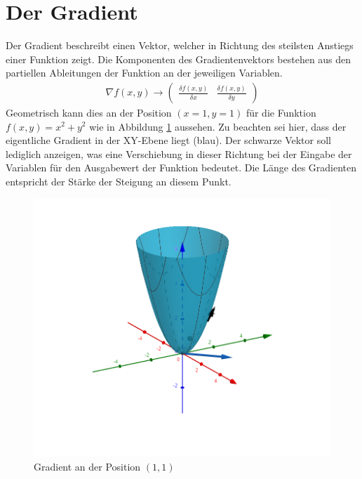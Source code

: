 \section{Der Gradient}\label{chapter:00_gradient}
Der Gradient beschreibt einen Vektor, welcher in Richtung des steilsten Anstiegs einer Funktion zeigt.
Die Komponenten des Gradientenvektors bestehen aus den partiellen Ableitungen der Funktion an der jeweiligen Variablen.
\begin{align}
    \nabla f(x,y) \longrightarrow \begin{pmatrix} \frac{\delta f(x,y)}{\delta x} & \frac{\delta f(x,y)}{\delta y} \end{pmatrix}
\end{align}
Geometrisch kann dies an der Position $(x = 1, y = 1)$ für die Funktion $f(x, y) = x^2 + y^2$  wie in Abbildung
\ref{fig:01_gradient} aussehen. Zu beachten sei hier, dass der eigentliche Gradient in der XY-Ebene liegt (blau).
Der schwarze Vektor soll lediglich anzeigen, was eine Verschiebung in dieser Richtung bei der Eingabe der Variablen
für den Ausgabewert der Funktion bedeutet. Die Länge des Gradienten entspricht der Stärke der Steigung an diesem Punkt.

\begin{figure}[h!]
    \begin{center}
        \includegraphics[width=0.6\linewidth]{../common/02_appendix/00_resources/01_gradient.png}
    \end{center}
    \caption{Gradient an der Position $(1, 1)$}
    \label{fig:01_gradient}
\end{figure}

